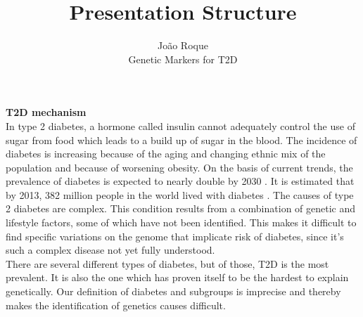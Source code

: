 \documentclass[12pt]{article}
\begin{document}
 
 
%
\title{Presentation Structure}%
\author{João Roque\\ %
Genetic Markers for T2D} %
 
\maketitle


\textbf{T2D mechanism}
\vspace{0.1in} \\
\indent 
In type 2 diabetes, a hormone called insulin cannot adequately control the use of sugar from food which leads to a build up of sugar in the blood. The incidence of diabetes is increasing because of the aging and changing ethnic mix of the population and because of worsening obesity. On the basis of current trends, the prevalence of diabetes is expected to nearly double by 2030 \cite{vijan2010type}. It is estimated that by 2013, 382 million people in the world lived with diabetes \cite{prasad2015genetics}. The causes of type 2 diabetes are complex. This condition results from a combination of genetic and lifestyle factors, some of which have not been identified. This makes it difficult to find specific variations on the genome that implicate risk of diabetes, since it's such a complex disease not yet fully understood. \\
\indent 
There are several different types of diabetes, but of those, T2D is the most prevalent. It is also the one which has proven itself to be the hardest to explain genetically. Our definition of diabetes and subgroups is imprecise and thereby makes the identification of genetics causes difficult. \\
\end{document}
